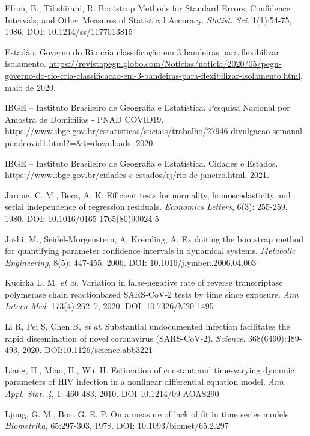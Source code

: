 Efron, B., Tibshirani, R. Bootstrap Methods for Standard Errors, Confidence
Intervals, and Other Measures of Statistical Accuracy. {\it Statist. Sci.}
1(1):54-75, 1986. DOI: 10.1214/ss/1177013815

Estadão. Governo do Rio cria classificação em 3 bandeiras para flexibilizar isolamento. \url{https://revistapegn.globo.com/Noticias/noticia/2020/05/pegn-governo-do-rio-cria-classificacao-em-3-bandeiras-para-flexibilizar-isolamento.html}, maio de 2020.

IBGE – Instituto Brasileiro de Geografia e Estatística. Pesquisa Nacional por
Amostra de Domicílios - PNAD COVID19.
\url{https://www.ibge.gov.br/estatisticas/sociais/trabalho/27946-divulgacao-semanal-pnadcovid1.html?=&t=downloads}.
2020.

IBGE – Instituto Brasileiro de Geografia e Estatística. Cidades e Estados.
\url{https://www.ibge.gov.br/cidades-e-estados/rj/rio-de-janeiro.html}.
2021.

Jarque, C. M., Bera, A. K. Efficient tests for normality, homoscedasticity and serial independence of regression residuals.
{\it Economics Letters}, 6(3): 255-259, 1980. DOI:
10.1016/0165-1765(80)90024-5

Joshi, M., Seidel-Morgenstern, A. Kremling, A. Exploiting the bootstrap method
for quantifying parameter confidence intervals in dynamical systems. {\it
Metabolic Engineering}, 8(5): 447-455, 2006. DOI: 10.1016/j.ymben.2006.04.003

Kucirka L. M. {\it et al}. Variation in
false-negative rate of reverse transcriptase polymerase chain reactionbased
SARS-CoV-2 tests by time since exposure. {\it Ann Intern Med}. 173(4):262–7,
2020. DOI: 10.7326/M20-1495

Li R, Pei S, Chen B, {\it et al}. Substantial undocumented infection
facilitates the rapid dissemination of novel coronavirus (SARS-CoV-2). {\it Science}.
368(6490):489-493, 2020. DOI:10.1126/science.abb3221

Liang, H., Miao, H., Wu, H. Estimation of constant and time-varying dynamic parameters of HIV infection in a nonlinear differential equation model. {\it Ann. Appl. Stat. 4}, 1: 460-483, 2010. DOI 10.1214/09-AOAS290

Ljung, G. M., Box, G. E. P. On a measure of lack of fit in time series models.
{\it Biometrika}, 65:297-303, 1978. DOI: 10.1093/biomet/65.2.297

